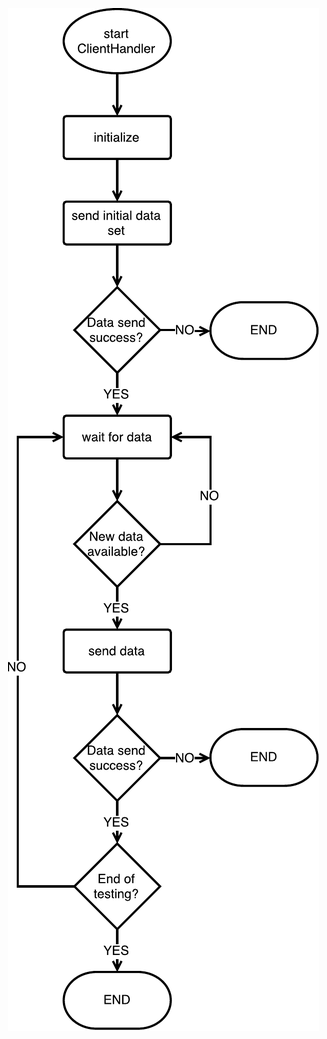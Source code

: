 	\begin{figure}
	  \centering
	  \begin{minipage}{0.45\textwidth}
	    \centering
	    \includegraphics[height=0.95\textheight, keepaspectratio, center]{obrazky-figures/inrunjunit_clienthandler_flowchart.pdf}

\end{minipage}
\end{figure}
